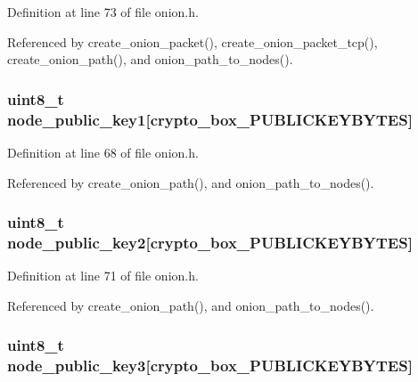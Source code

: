 Definition at line 73 of file onion.\+h.



Referenced by create\+\_\+onion\+\_\+packet(), create\+\_\+onion\+\_\+packet\+\_\+tcp(), create\+\_\+onion\+\_\+path(), and onion\+\_\+path\+\_\+to\+\_\+nodes().

\hypertarget{struct_onion___path_a38f4e3f7780648cf74f808d7942113d8}{
\subsubsection[{node\+\_\+public\+\_\+key1}]{\setlength{\rightskip}{0pt plus 5cm}uint8\+\_\+t node\+\_\+public\+\_\+key1\mbox{[}crypto\+\_\+box\+\_\+\+P\+U\+B\+L\+I\+C\+K\+E\+Y\+B\+Y\+T\+E\+S\mbox{]}}}\label{struct_onion___path_a38f4e3f7780648cf74f808d7942113d8}


Definition at line 68 of file onion.\+h.



Referenced by create\+\_\+onion\+\_\+path(), and onion\+\_\+path\+\_\+to\+\_\+nodes().

\hypertarget{struct_onion___path_adc5a9730c2f43085e83ece3257af154a}{
\subsubsection[{node\+\_\+public\+\_\+key2}]{\setlength{\rightskip}{0pt plus 5cm}uint8\+\_\+t node\+\_\+public\+\_\+key2\mbox{[}crypto\+\_\+box\+\_\+\+P\+U\+B\+L\+I\+C\+K\+E\+Y\+B\+Y\+T\+E\+S\mbox{]}}}\label{struct_onion___path_adc5a9730c2f43085e83ece3257af154a}


Definition at line 71 of file onion.\+h.



Referenced by create\+\_\+onion\+\_\+path(), and onion\+\_\+path\+\_\+to\+\_\+nodes().

\hypertarget{struct_onion___path_a4725b29fc0349714fa0ab0938844cf19}{
\subsubsection[{node\+\_\+public\+\_\+key3}]{\setlength{\rightskip}{0pt plus 5cm}uint8\+\_\+t node\+\_\+public\+\_\+key3\mbox{[}crypto\+\_\+box\+\_\+\+P\+U\+B\+L\+I\+C\+K\+E\+Y\+B\+Y\+T\+E\+S\mbox{]}}}\label{struct_onion___path_a4725b29fc0349714fa0ab0938844cf19}


